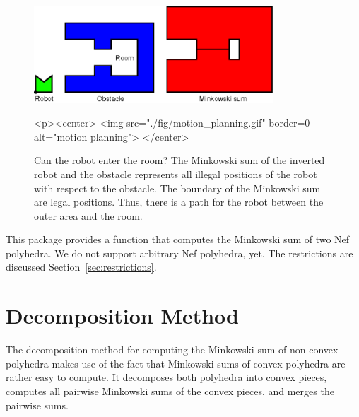 \begin{figure}
  \begin{ccTexOnly}
    \begin{center}
      \includegraphics[width=0.8\textwidth]{Minkowski_sum_3/fig/motion_planning}
    \end{center}
  \end{ccTexOnly}
  \begin{ccHtmlOnly}
    <p><center>
    <img src="./fig/motion_planning.gif" border=0 alt="motion planning">
    </center>
  \end{ccHtmlOnly}
  \caption{Can the robot enter the room? The Minkowski sum of the inverted
           robot and the obstacle represents all illegal positions of the 
           robot with respect to the obstacle. 
           The boundary of the Minkowski sum are legal positions. Thus, there
           is a path for the robot between the outer area and the room.}
  \label{fig:motionPlanning}
\end{figure}

This package provides a function  that computes
the Minkowski sum of two Nef polyhedra. We do not support arbitrary
Nef polyhedra, yet. The restrictions are discussed
Section~\ref{sec:restrictions}.

\section{Decomposition Method}

The decomposition method for computing the Minkowski sum of non-convex
polyhedra makes use of the fact that Minkowski sums of convex
polyhedra are rather easy to compute. It decomposes both polyhedra
into convex pieces, computes all pairwise Minkowski sums of the convex
pieces, and merges the pairwise sums.

